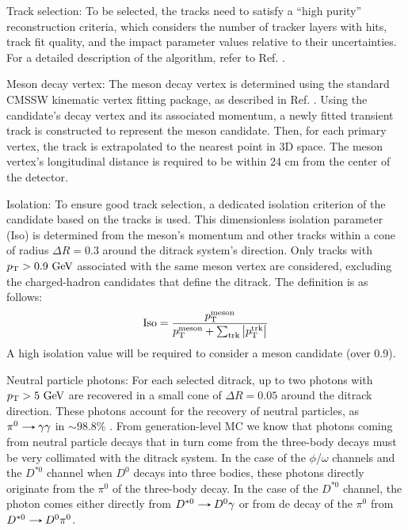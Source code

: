 \begin{myitemlist}
    \item[Track selection:] To be selected, the tracks need to satisfy a ``high purity'' reconstruction criteria, which considers the number of tracker layers with hits, track fit quality, and the impact parameter values relative to their uncertainties. For a detailed description of the algorithm, refer to Ref. \cite{CMS:2014pgm}.

    \item[Meson decay vertex:] The meson decay vertex is determined using the standard CMSSW \cite{CMSSW} kinematic vertex fitting package, as described in Ref. \cite{Prokofiev:2005zz}. Using the candidate's decay vertex and its associated momentum, a newly fitted transient track is constructed to represent the meson candidate. Then, for each primary vertex, the track is extrapolated to the nearest point in 3D space. The meson vertex's longitudinal distance is required to be within 24 cm from the center of the detector.
    
    \item[Isolation:] To ensure good track selection, a dedicated isolation criterion of the candidate based on the tracks is used. This dimensionless isolation parameter (Iso) is determined from the meson's momentum and other tracks within a cone of radius $\Delta R = 0.3$ around the ditrack system's direction. Only tracks with $p_\text{T} > 0.9\ \text{GeV}$ associated with the same meson vertex are considered, excluding the charged-hadron candidates that define the ditrack. The definition is as follows:
    \begin{equation*}
        \text{Iso} = \frac{p_\text{T}^{\text{meson}}}{p_\text{T}^{\text{meson}}+\sum_{\text{trk}}{\left\lvert p_\text{T}^{\text{trk}}\right\rvert}}
    \end{equation*}
    A high isolation value will be required to consider a meson candidate (over 0.9).

    \item[Neutral particle photons:] For each selected ditrack, up to two photons with $p_\text{T} > 5 \ \text{GeV}$ are recovered in a small cone of $\Delta R = 0.05$ around the ditrack direction. These photons account for the recovery of neutral particles, as $\pi^{0}\decaysto\gamma\gamma$ in $\sim 98.8\%$ \cite{PDG}. From generation-level MC we know that photons coming from neutral particle decays that in turn come from the three-body decays must be very collimated with the ditrack system. In the case of the $\phi$/$\omega$ channels and the $D^{*0}$ channel when $D^{0}$ decays into three bodies, these photons directly originate from the $\pi^0$ of the three-body decay. In the case of the $D^{*0}$ channel, the photon comes either directly from $D^{*0}\decaysto D^{0}\gamma$ or from de decay of the $\pi^0$ from $D^{*0}\decaysto D^{0}\pi^0$.
    

\end{myitemlist}

